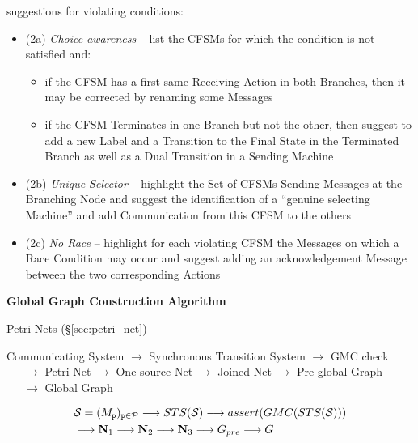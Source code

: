 suggestions for violating conditions:
\begin{itemize}
\item (2a) \emph{Choice-awareness} -- list the CFSMs for which the
  condition is not satisfied and:
  \begin{itemize}
    \item if the CFSM has a first same Receiving Action in both
      Branches, then it may be corrected by renaming some Messages
    \item if the CFSM Terminates in one Branch but not the other, then
      suggest to add a new Label and a Transition to the Final State
      in the Terminated Branch as well as a Dual Transition in a
      Sending Machine
  \end{itemize}
\item (2b) \emph{Unique Selector} -- highlight the Set of CFSMs
  Sending Messages at the Branching Node and suggest the
  identification of a ``genuine selecting Machine'' and add
  Communication from this CFSM to the others
\item (2c) \emph{No Race} -- highlight for each violating CFSM the
  Messages on which a Race Condition may occur and suggest adding an
  acknowledgement Message between the two corresponding Actions
\end{itemize}


\textbf{Global Graph Construction Algorithm}

\fist Petri Nets (\S\ref{sec:petri_net})

Communicating System $\longrightarrow$ Synchronous Transition System
  $\longrightarrow$ GMC check \\
\-\ \-\ \-\ $\longrightarrow$ Petri Net
  $\longrightarrow$ One-source Net $\longrightarrow$ Joined Net
  $\longrightarrow$ Pre-global Graph \\
\-\ \-\ \-\
  $\longrightarrow$ Global Graph

\begin{align*}
  & \mathcal{S} = (M_\mathtt{p})_{\mathtt{p}\in\mathcal{P}}
    \longrightarrow STS(\mathcal{S})
    \longrightarrow assert(GMC(STS(\mathcal{S}))) \\
  & \longrightarrow \mathbf{N}_1 \longrightarrow \mathbf{N}_2
    \longrightarrow \mathbf{N}_3 \longrightarrow G_{pre}
    \longrightarrow G
\end{align*}

